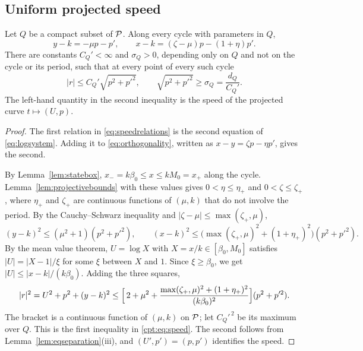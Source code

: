 \subsection{Uniform projected speed}
\begin{lemma}\label{lem:speed}
Let $Q$ be a compact subset of $\mathcal P$. Along every cycle with parameters in $Q$,
\begin{equation}\label{eq:speedrelations}
y-k=-\mu p-p',\qquad
x-k=(\zeta-\mu)p-(1+\eta)p' .
\end{equation}
There are constants $C_Q'<\infty$ and $\sigma_Q>0$, depending only on $Q$ and not on the cycle or its period, such that at every point of every such cycle
\begin{equation}\label{cpt:eq:speed}
|r|\le C_Q'\sqrt{p^2+p'^2},\qquad
\sqrt{p^2+p'^2}\ge\sigma_Q=\frac{d_Q}{C_Q'} .
\end{equation}
The left-hand quantity in the second inequality is the speed of the projected curve $t\mapsto(U,p)$.
\end{lemma}
\begin{proof}
The first relation in \eqref{eq:speedrelations} is the second equation of \eqref{eq:logsystem}. Adding it to \eqref{eq:orthogonality}, written as $x-y=\zeta p-\eta p'$, gives the second.

By Lemma~\ref{lem:statebox}, $x_-=k\beta_0\le x\le kM_0=x_+$ along the cycle. Lemma~\ref{lem:projectivebounds} with these values gives $0<\eta\le\eta_+$ and $0<\zeta\le\zeta_+$, where $\eta_+$ and $\zeta_+$ are continuous functions of $(\mu,k)$ that do not involve the period. By the Cauchy--Schwarz inequality and $|\zeta-\mu|\le\max(\zeta_+,\mu)$,
\[
(y-k)^2\le(\mu^2+1)(p^2+p'^2),\qquad
(x-k)^2\le\bigl(\max(\zeta_+,\mu)^2+(1+\eta_+)^2\bigr)(p^2+p'^2).
\]
By the mean value theorem, $U=\log X$ with $X=x/k\in[\beta_0,M_0]$ satisfies $|U|=|X-1|/\xi$ for some $\xi$ between $X$ and $1$. Since $\xi\ge\beta_0$, we get $|U|\le|x-k|/(k\beta_0)$. Adding the three squares,
\[
|r|^2=U^2+p^2+(y-k)^2\le\Bigl[\,2+\mu^2+\frac{\max(\zeta_+,\mu)^2+(1+\eta_+)^2}{(k\beta_0)^2}\Bigr](p^2+p'^2).
\]
The bracket is a continuous function of $(\mu,k)$ on $\mathcal P$; let $C_Q'^{\,2}$ be its maximum over $Q$. This is the first inequality in \eqref{cpt:eq:speed}. The second follows from Lemma~\ref{lem:eqseparation}(iii), and $(U',p')=(p,p')$ identifies the speed.
\end{proof}

